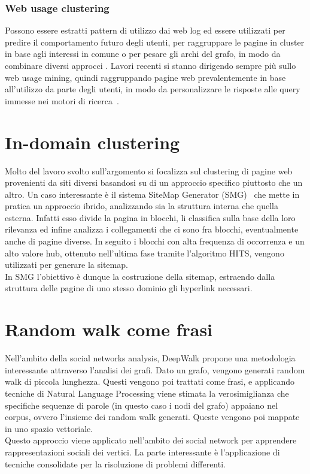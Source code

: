 \subsubsection{Web usage clustering}
Possono essere estratti pattern di utilizzo dai web log ed essere utilizzati per predire il comportamento futuro degli utenti, per raggruppare le pagine in cluster in base agli interessi in comune o per pesare gli archi del grafo, in modo da combinare diversi approcci \cite{Shahabi97}. Lavori recenti si stanno dirigendo sempre più sullo web usage mining, quindi raggruppando pagine web prevalentemente in base all'utilizzo da parte degli utenti, in modo da personalizzare le risposte alle query immesse nei motori di ricerca~\cite{Crabtree06}.


\section{In-domain clustering}
Molto del lavoro svolto sull'argomento si focalizza sul clustering di pagine web provenienti da siti diversi basandosi su di un approccio specifico piuttosto che un altro. Un caso interessante è il sistema SiteMap Generator (SMG)~\cite{Lin11} che mette in pratica un approccio ibrido, analizzando sia la struttura interna che quella esterna. Infatti esso divide la pagina in blocchi, li classifica sulla base della loro rilevanza ed infine analizza i collegamenti che ci sono fra blocchi, eventualmente anche di pagine diverse. In seguito i blocchi con alta frequenza di occorrenza e un alto valore hub, ottenuto nell'ultima fase tramite l'algoritmo HITS, vengono utilizzati per generare la sitemap.
\\
In SMG l'obiettivo è dunque la costruzione della sitemap, estraendo dalla struttura delle pagine di uno stesso dominio gli hyperlink necessari.

\section{Random walk come frasi}
Nell'ambito della social networks analysis, DeepWalk \cite{Perozzi14} propone una metodologia interessante attraverso l'analisi dei grafi. Dato un grafo, vengono generati random walk di piccola lunghezza. Questi vengono poi trattati come frasi, e applicando tecniche di Natural Language Processing viene stimata la verosimiglianza che specifiche sequenze di parole (in questo caso i nodi del grafo) appaiano nel corpus, ovvero l'insieme dei random walk generati. Queste vengono poi mappate in uno spazio vettoriale.
\\
Questo approccio viene applicato nell'ambito dei social network per apprendere rappresentazioni sociali dei vertici. La parte interessante è l'applicazione di tecniche consolidate per la risoluzione di problemi differenti.

